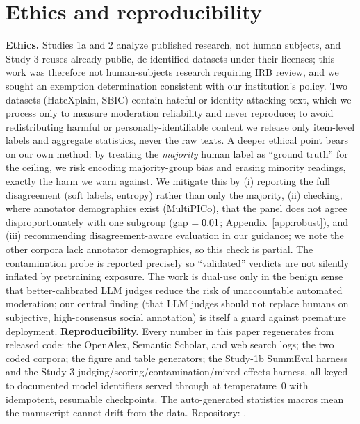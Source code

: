 \section{Ethics and reproducibility}
\textbf{Ethics.} Studies 1a and 2 analyze published research, not human subjects, and Study 3 reuses already-public,
de-identified datasets under their licenses; this work was therefore not human-subjects research requiring IRB
review, and we sought an exemption determination consistent with our institution's policy. Two datasets (HateXplain,
SBIC) contain hateful or identity-attacking text, which we process only to measure moderation reliability and never
reproduce; to avoid redistributing harmful or personally-identifiable content we release only item-level labels and
aggregate statistics, never the raw texts. A deeper ethical point bears on our own method: by treating the
\emph{majority} human label as ``ground truth'' for the ceiling, we risk encoding majority-group bias and erasing
minority readings, exactly the harm we warn against. We mitigate this by (i) reporting the full disagreement (soft
labels, entropy) rather than only the majority, (ii) checking, where annotator demographics exist (MultiPICo), that
the panel does not agree disproportionately with one subgroup (gap $=0.01$; Appendix~\ref{app:robust}), and
(iii) recommending disagreement-aware evaluation in our guidance; we note the other corpora lack annotator
demographics, so this check is partial. The contamination probe is reported precisely so ``validated'' verdicts are
not silently inflated by pretraining exposure. The work is dual-use only in the benign sense that better-calibrated
LLM judges reduce the risk of unaccountable automated moderation; our central finding (that LLM judges should not
replace humans on subjective, high-consensus social annotation) is itself a guard against premature deployment.
\textbf{Reproducibility.} Every number in this paper regenerates from released code: the OpenAlex, Semantic Scholar,
and web search logs; the two coded corpora; the figure and table generators; the Study-1b SummEval harness and the
Study-3 judging/scoring/contamination/mixed-effects harness, all keyed to documented model identifiers served through
\PROVIDER{} at temperature~$0$ with idempotent, resumable checkpoints. The auto-generated statistics macros
mean the manuscript cannot drift from the data. Repository: \REPO{}.

